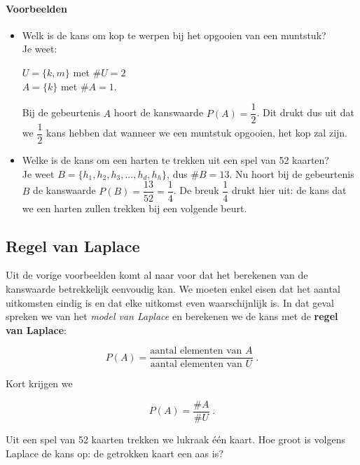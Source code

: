 \documentclass[12pt,twoside]{article}
\begin{document}
\paragraph*{Voorbeelden}

\begin{itemize}
  \item Welk is de kans om kop te werpen bij het opgooien van een muntstuk?\\
  Je weet:
  \begin{minipage}[t]{\textwidth}
    $U =\{k, m\}$ met $\#U = 2$\\
    $A = \{k\}$ met $\#A = 1$.
  \end{minipage}
  Bij de gebeurtenis $A$ hoort de kanswaarde $P(A) =\dfrac{1}{2}$. Dit drukt dus uit dat we $\dfrac{1}{2}$ kans hebben dat wanneer we een muntstuk opgooien, het kop zal zijn.
  \item Welke is de kans om een harten te trekken uit een spel van 52 kaarten?\\
  Je weet $B = \{h_1 , h_2 , h_3 , ..., h_d , h_h\}$, dus $\#B=13$.
  Nu hoort bij de gebeurtenis $B$ de kanswaarde $P(B)=\dfrac{13}{52}=\dfrac{1}{4}$. De breuk $\dfrac{1}{4}$ drukt hier uit: de kans dat we een harten zullen trekken bij een volgende beurt.
\end{itemize}

\subsection{Regel van Laplace}

Uit de vorige voorbeelden komt al naar voor dat het berekenen van de kanswaarde betrekkelijk eenvoudig kan. We moeten enkel eisen dat het aantal uitkomsten eindig is en dat elke uitkomst even waarschijnlijk is. In dat geval spreken we van het {\em model van Laplace} en berekenen we de kans met de {\bf regel van Laplace}:

$$P(A)=\dfrac{\mbox{aantal elementen van }A}{\mbox{aantal elementen van }U}\;.$$

Kort krijgen we\\
\begin{mdframed}
$$P(A)=\dfrac{\#A}{\#U}\;.$$
\end{mdframed}

\begin{oefening}
Uit een spel van 52 kaarten trekken we lukraak één kaart. Hoe groot is volgens Laplace de kans op: de getrokken kaart een aas is?
\end{oefening}
\end{document}
